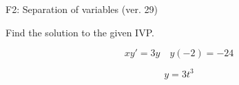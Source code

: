 \begin{exercise}
  \begin{exerciseTitle}F2: Separation of variables (ver. 29)\end{exerciseTitle}
  \begin{exerciseStatement}
    
Find the solution to the given IVP.

    
\[xy'= 3 y \hspace{1em} y( -2 ) = -24\]

  \end{exerciseStatement}
  \begin{exerciseAnswer}
    
\[y= 3 t^ 3\]

  \end{exerciseAnswer}
\end{exercise}